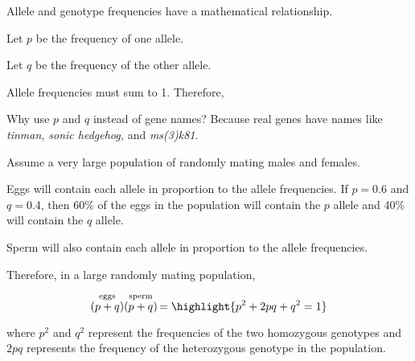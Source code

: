 \documentclass[t,handout]{beamer}  %
\begin{document}
\begin{frame}[t]{Allele and genotype frequencies have a mathematical relationship.}
	
	\hangpara Let $p$ be the frequency of one allele.
	
	\hangpara Let $q$ be the frequency of the other allele.
	
	\hangpara Allele frequencies must sum to 1. Therefore,
	
	\highlight{\[ p + q = 1.\]}
	
	\pause
	
	\vspace{\baselineskip}
	
	\hangpara {} Why use $p$ and $q$ instead of gene names?  Because real genes have names like \emph{tinman,} \emph{sonic hedgehog,} and \emph{ms(3)k81}.
\end{frame}
%
\begin{frame}[t]{Assume a very large population of randomly mating males and females.}

	\hangpara Eggs will contain each allele in proportion to the allele frequencies. If $p = 0.6$ and $q = 0.4$, then 60\% of the eggs in the population will contain the $p$ allele and 40\% will contain the $q$ allele.
	
	\hangpara Sperm will also contain each allele in proportion to the allele frequencies. 
	
	\hangpara Therefore, in a large randomly mating population, 
	
	\[ \stackrel{\text{eggs}}{(p + q)}
	\stackrel{\text{sperm}}{(p + q)}\, 
	= \highlight{p^2 + 2pq + q^2 = 1} \]
	
	\hangpara where $p^2$ and $q^2$ represent the frequencies of the two homozygous genotypes and $2pq$ represents the frequency of the heterozygous genotype in the population.
\end{frame}
%
{
\begin{frame}[c]%

\centering
{}
\end{frame}
}
\end{document}
